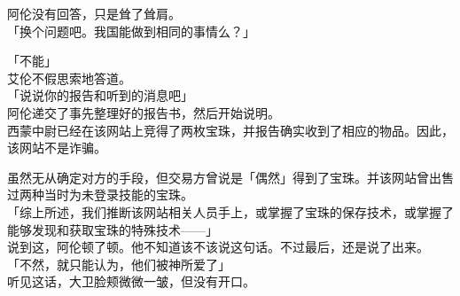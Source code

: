 阿伦没有回答，只是耸了耸肩。\\

「换个问题吧。我国能做到相同的事情么？」

「不能」\\

艾伦不假思索地答道。\\

「说说你的报告和听到的消息吧」\\

阿伦递交了事先整理好的报告书，然后开始说明。\\

西蒙中尉已经在该网站上竞得了两枚宝珠，并报告确实收到了相应的物品。因此，该网站不是诈骗。

虽然无从确定对方的手段，但交易方曾说是「偶然」得到了宝珠。并该网站曾出售过两种当时为未登录技能的宝珠。\\

「综上所述，我们推断该网站相关人员手上，或掌握了宝珠的保存技术，或掌握了能够发现和获取宝珠的特殊技术——」\\

说到这，阿伦顿了顿。他不知道该不该说这句话。不过最后，还是说了出来。\\

「不然，就只能认为，他们被神所爱了」\\

听见这话，大卫脸颊微微一皱，但没有开口。

